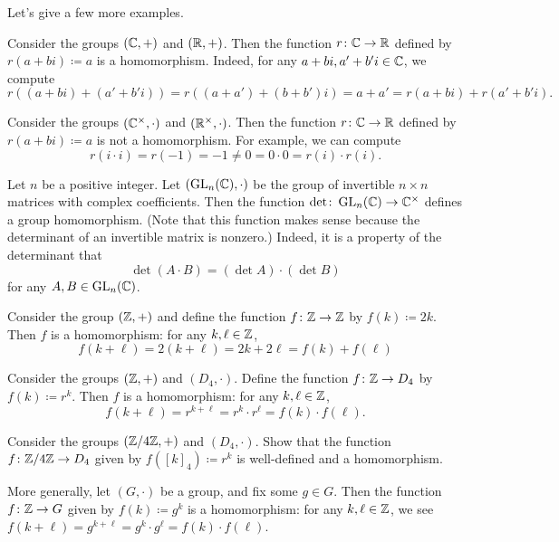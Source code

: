 \documentclass[../notes.tex]{subfiles}
\begin{document}
Let's give a few more examples.
\begin{example} \label{ex:real-part-hom}
    Consider the groups $(\mathbb C,+)$ and $(\mathbb R,+)$. Then the function $r\colon\mathbb C\to\mathbb R$ defined by $r(a+bi)\coloneqq a$ is a homomorphism. Indeed, for any $a+bi,a'+b'i\in\mathbb C$, we compute
    \[r((a+bi)+(a'+b'i))=r((a+a')+(b+b')i)=a+a'=r(a+bi)+r(a'+b'i).\]
\end{example}
\begin{nex}
    Consider the groups $(\mathbb C^\times,\cdot)$ and $(\mathbb R^\times,\cdot)$. Then the function $r\colon\mathbb C\to\mathbb R$ defined by $r(a+bi)\coloneqq a$ is not a homomorphism. For example, we can compute
    \[r(i\cdot i)=r(-1)=-1\ne0=0\cdot0=r(i)\cdot r(i).\]
\end{nex}
\begin{example} \label{ex:det-hom}
    Let $n$ be a positive integer. Let $(\operatorname{GL}_n(\mathbb C),\cdot)$ be the group of invertible $n\times n$ matrices with complex coefficients. Then the function $\det\colon\operatorname{GL}_n(\mathbb C)\to\mathbb C^\times$ defines a group homomorphism. (Note that this function makes sense because the determinant of an invertible matrix is nonzero.) Indeed, it is a property of the determinant that
    \[\det(A\cdot B)=(\det A)\cdot(\det B)\]
    for any $A,B\in\operatorname{GL}_n(\mathbb C)$.
\end{example}
\begin{example} \label{ex:double-z-hom}
    Consider the group $(\mathbb Z,+)$ and define the function $f\colon\mathbb Z\to\mathbb Z$ by $f(k)\coloneqq2k$. Then $f$ is a homomorphism: for any $k,\ell\in\mathbb Z$,
    \[f(k+\ell)=2(k+\ell)=2k+2\ell=f(k)+f(\ell)\]
\end{example}
\begin{example} \label{ex:z-to-d4}
    Consider the groups $(\mathbb Z,+)$ and $(D_4,\cdot)$. Define the function $f\colon\mathbb Z\to D_4$ by $f(k)\coloneqq r^k$. Then $f$ is a homomorphism: for any $k,\ell\in\mathbb Z$,
    \[f(k+\ell)=r^{k+\ell}=r^k\cdot r^\ell=f(k)\cdot f(\ell).\]
\end{example}
\begin{exe}
    Consider the groups $(\mathbb Z/4\mathbb Z,+)$ and $(D_4,\cdot)$. Show that the function $f\colon\mathbb Z/4\mathbb Z\to D_4$ given by $f([k]_4)\coloneqq r^k$ is well-defined and a homomorphism.
\end{exe}
\begin{example} \label{ex:cyclic-subgroup-hom}
    More generally, let $(G,\cdot)$ be a group, and fix some $g\in G$. Then the function $f\colon\mathbb Z\to G$ given by $f(k)\coloneqq g^k$ is a homomorphism: for any $k,\ell\in\mathbb Z$, we see $f(k+\ell)=g^{k+\ell}=g^k\cdot g^\ell=f(k)\cdot f(\ell)$.
\end{example}
\end{document}
